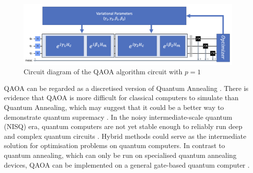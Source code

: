 \begin{figure}[h!]
    \centering
    \includegraphics[width=\linewidth]{images/qaoa_circuit.png}
    \caption{Circuit diagram of the QAOA algorithm circuit with $p=1$}
    \label{qaoacircuit}
\end{figure}

QAOA can be regarded as a discretised version of Quantum Annealing \cite{qaoareview}. There is evidence that QAOA is more difficult for classical computers to simulate than Quantum Annealing, which may suggest that it could be a better way to demonstrate quantum supremacy \cite{farhi2016quantum}. In the noisy intermediate-scale quantum (NISQ) era, quantum computers are not yet stable enough to reliably run deep and complex quantum circuits \cite{qaoareview}. Hybrid methods could serve as the intermediate solution for optimisation problems on quantum computers. In contrast to quantum annealing, which can only be run on specialised quantum annealing devices, QAOA can be implemented on a general gate-based quantum computer \cite{b22}. 